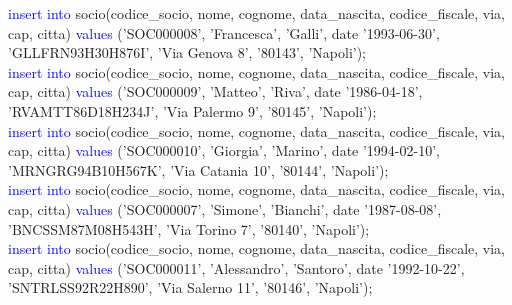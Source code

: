 \documentclass{article}
\begin{document}
\begin{flushleft}
{        \vspace{2mm}
        \hspace*{0.5em}\textcolor{blue}{insert into} socio(codice\_socio, nome, cognome, data\_nascita, codice\_fiscale, via, \hspace*{0.5em}cap, citta) \textcolor{blue}{values} ('SOC000008', 'Francesca', 'Galli', date '1993-06-30', \hspace*{0.4em}'GLLFRN93H30H876I', 'Via Genova 8', '80143', 'Napoli'); \\
        \vspace{2mm}
        \hspace*{0.5em}\textcolor{blue}{insert into} socio(codice\_socio, nome, cognome, data\_nascita, codice\_fiscale, via, \hspace*{0.5em}cap, citta) \textcolor{blue}{values} ('SOC000009', 'Matteo', 'Riva', date '1986-04-18', \hspace*{0.4em}'RVAMTT86D18H234J', 'Via Palermo 9', '80145', 'Napoli'); \\
        \vspace{2mm}
        \hspace*{0.5em}\textcolor{blue}{insert into} socio(codice\_socio, nome, cognome, data\_nascita, codice\_fiscale, via, \hspace*{0.5em}cap, citta) \textcolor{blue}{values} ('SOC000010', 'Giorgia', 'Marino', date '1994-02-10', \hspace*{0.4em}'MRNGRG94B10H567K', 'Via Catania 10', '80144', 'Napoli'); \\
        \vspace{2mm}
        \hspace*{0.5em}\textcolor{blue}{insert into} socio(codice\_socio, nome, cognome, data\_nascita, codice\_fiscale, via, \hspace*{0.5em}cap, citta) \textcolor{blue}{values} ('SOC000007', 'Simone', 'Bianchi', date '1987-08-08', \hspace*{0.4em}'BNCSSM87M08H543H', 'Via Torino 7', '80140', 'Napoli'); \\
        \vspace{2mm}
        \hspace*{0.5em}\textcolor{blue}{insert into} socio(codice\_socio, nome, cognome, data\_nascita, codice\_fiscale, via, \hspace*{0.5em}cap, citta) \textcolor{blue}{values} ('SOC000011', 'Alessandro', 'Santoro', date '1992-10-22', \hspace*{0.4em}'SNTRLSS92R22H890', 'Via Salerno 11', '80146', 'Napoli'); \\
}
\end{flushleft}
\end{document}
